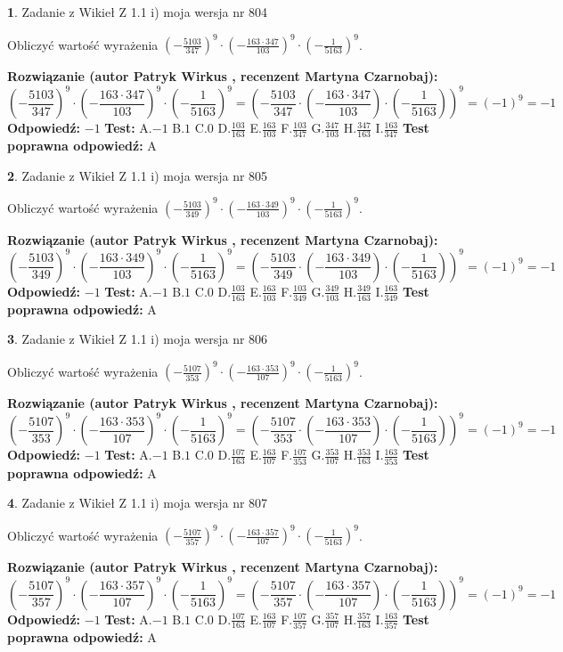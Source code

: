 \documentclass[12pt, a4paper]{article}
\theoremstyle{definition} %
\newtheorem{zad}{}
\newcommand{\zadStart}[1]{\begin{zad}#1\newline}
\newcommand{\zadStop}{\end{zad}}
\newcommand{\rozwStart}[2]{\noindent \textbf{Rozwiązanie (autor #1 , recenzent #2): }\newline}
\newcommand{\rozwStop}{\newline}
\newcommand{\odpStart}{\noindent \textbf{Odpowiedź:}\newline}
\newcommand{\odpStop}{\newline}
\newcommand{\testStart}{\noindent \textbf{Test:}\newline}
\newcommand{\testStop}{\newline}
\newcommand{\kluczStart}{\noindent \textbf{Test poprawna odpowiedź:}\newline}
\newcommand{\kluczStop}{\newline}
\begin{document}
\zadStart{Zadanie z Wikieł Z 1.1 i) moja wersja nr 804}

Obliczyć wartość wyrażenia $(-\frac{5103}{347})^{9} \cdot (-\frac{163 \cdot 347}{103})^{9} \cdot (-\frac{1}{5163})^{9}$.
\zadStop
\rozwStart{Patryk Wirkus}{Martyna Czarnobaj}
$$(-\frac{5103}{347})^{9} \cdot (-\frac{163 \cdot 347}{103})^{9} \cdot (-\frac{1}{5163})^{9} = (-\frac{5103}{347} \cdot (-\frac{163 \cdot 347}{103}) \cdot (-\frac{1}{5163}))^{9} = (-1)^{9} = -1$$
\rozwStop
\odpStart
$-1$
\odpStop
\testStart
A.$-1$ B.$1$ C.$0$ D.$\frac{103}{163}$ E.$\frac{163}{103}$
F.$\frac{103}{347}$ G.$\frac{347}{103}$
H.$\frac{347}{163}$
I.$\frac{163}{347}$
\testStop
\kluczStart
A
\kluczStop



\zadStart{Zadanie z Wikieł Z 1.1 i) moja wersja nr 805}

Obliczyć wartość wyrażenia $(-\frac{5103}{349})^{9} \cdot (-\frac{163 \cdot 349}{103})^{9} \cdot (-\frac{1}{5163})^{9}$.
\zadStop
\rozwStart{Patryk Wirkus}{Martyna Czarnobaj}
$$(-\frac{5103}{349})^{9} \cdot (-\frac{163 \cdot 349}{103})^{9} \cdot (-\frac{1}{5163})^{9} = (-\frac{5103}{349} \cdot (-\frac{163 \cdot 349}{103}) \cdot (-\frac{1}{5163}))^{9} = (-1)^{9} = -1$$
\rozwStop
\odpStart
$-1$
\odpStop
\testStart
A.$-1$ B.$1$ C.$0$ D.$\frac{103}{163}$ E.$\frac{163}{103}$
F.$\frac{103}{349}$ G.$\frac{349}{103}$
H.$\frac{349}{163}$
I.$\frac{163}{349}$
\testStop
\kluczStart
A
\kluczStop



\zadStart{Zadanie z Wikieł Z 1.1 i) moja wersja nr 806}

Obliczyć wartość wyrażenia $(-\frac{5107}{353})^{9} \cdot (-\frac{163 \cdot 353}{107})^{9} \cdot (-\frac{1}{5163})^{9}$.
\zadStop
\rozwStart{Patryk Wirkus}{Martyna Czarnobaj}
$$(-\frac{5107}{353})^{9} \cdot (-\frac{163 \cdot 353}{107})^{9} \cdot (-\frac{1}{5163})^{9} = (-\frac{5107}{353} \cdot (-\frac{163 \cdot 353}{107}) \cdot (-\frac{1}{5163}))^{9} = (-1)^{9} = -1$$
\rozwStop
\odpStart
$-1$
\odpStop
\testStart
A.$-1$ B.$1$ C.$0$ D.$\frac{107}{163}$ E.$\frac{163}{107}$
F.$\frac{107}{353}$ G.$\frac{353}{107}$
H.$\frac{353}{163}$
I.$\frac{163}{353}$
\testStop
\kluczStart
A
\kluczStop



\zadStart{Zadanie z Wikieł Z 1.1 i) moja wersja nr 807}

Obliczyć wartość wyrażenia $(-\frac{5107}{357})^{9} \cdot (-\frac{163 \cdot 357}{107})^{9} \cdot (-\frac{1}{5163})^{9}$.
\zadStop
\rozwStart{Patryk Wirkus}{Martyna Czarnobaj}
$$(-\frac{5107}{357})^{9} \cdot (-\frac{163 \cdot 357}{107})^{9} \cdot (-\frac{1}{5163})^{9} = (-\frac{5107}{357} \cdot (-\frac{163 \cdot 357}{107}) \cdot (-\frac{1}{5163}))^{9} = (-1)^{9} = -1$$
\rozwStop
\odpStart
$-1$
\odpStop
\testStart
A.$-1$ B.$1$ C.$0$ D.$\frac{107}{163}$ E.$\frac{163}{107}$
F.$\frac{107}{357}$ G.$\frac{357}{107}$
H.$\frac{357}{163}$
I.$\frac{163}{357}$
\testStop
\kluczStart
A
\kluczStop
\end{document}
